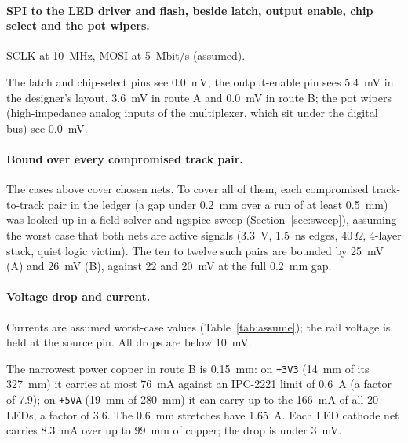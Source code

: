 \documentclass[10pt,a4paper]{article}
\begin{document}
\paragraph{SPI to the LED driver and flash, beside latch, output enable, chip select and the pot wipers.} SCLK at 10~MHz, MOSI at 5~Mbit/s (assumed).
\begin{table}[H]\centering\small\caption{SPI case: peak deviation (mV).}\end{table}
The latch and chip-select pins see 0.0~mV; the output-enable pin sees 5.4~mV in the designer's layout, 3.6~mV in route A and 0.0~mV in route B; the pot wipers (high-impedance analog inputs of the multiplexer, which sit under the digital bus) see 0.0~mV.

\paragraph{Bound over every compromised track pair.} The cases above cover chosen nets. To cover all of them, each compromised track-to-track pair in the ledger (a gap under 0.2~mm over a run of at least 0.5~mm) was looked up in a field-solver and ngspice sweep (Section~\ref{sec:sweep}), assuming the worst case that both nets are active
signals (3.3~V, 1.5~ns edges, 40\,$\Omega$, 4-layer stack, quiet logic victim). The ten to twelve such pairs are bounded by 25~mV (A) and 26~mV (B), against 22 and 20~mV at the full 0.2~mm gap.
\begin{table}[H]\centering\small\caption{Worst compromised track pairs of route B: bound in mV at the actual gap and at 0.2~mm.}\end{table}

\paragraph{Voltage drop and current.} Currents are assumed worst-case values (Table~\ref{tab:assume}); the rail voltage is held at the source pin. All drops are below 10~mV.
\begin{table}[H]\centering\small\caption{DC drop at the worst sink (mV) and the narrowest track against its IPC-2221 limit (outer layer, 10\,$^\circ$C rise).}\end{table}
The narrowest power copper in route B is 0.15~mm: on \texttt{+3V3} (14~mm of its 327~mm) it carries at most 76~mA against an IPC-2221 limit of 0.6~A (a factor of 7.9); on \texttt{+5VA} (19~mm of 280~mm) it can carry up to the 166~mA of all 20 LEDs, a factor of 3.6. The 0.6~mm stretches have 1.65~A. Each LED cathode net carries 8.3~mA over up to 99~mm of copper; the drop is under 3~mV.
\end{document}

